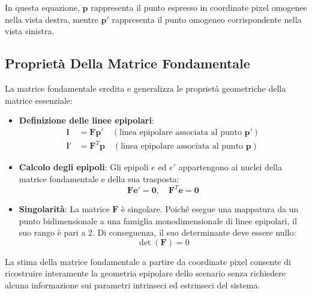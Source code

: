 ﻿\documentclass[11pt, a4paper]{article}
\begin{document}
In questa equazione, $\bm{p}$ rappresenta il punto espresso in coordinate pixel omogenee nella vista destra, mentre $\bm{p}'$ rappresenta il punto omogeneo corrispondente nella vista sinistra.

\subsection{Proprietà Della Matrice Fondamentale}

La matrice fondamentale eredita e generalizza le proprietà geometriche della matrice essenziale:


\begin{itemize}[noitemsep]
    \item \textbf{Definizione delle linee epipolari}:
    \begin{align}
        \bm{l} &= \bm{F} \bm{p}' \quad (\text{linea epipolare associata al punto } \bm{p}') \\
        \bm{l}' &= \bm{F}^T \bm{p} \quad (\text{linea epipolare associata al punto } \bm{p})
    \end{align}
    \item \textbf{Calcolo degli epipoli}: Gli epipoli $e$ ed $e'$ appartengono ai nuclei della matrice fondamentale e della sua trasposta:
    \begin{equation}
        \bm{F} \bm{e}' = \bm{0}, \quad \bm{F}^T \bm{e} = \bm{0}
    \end{equation}
    \item \textbf{Singolarità}: La matrice $\bm{F}$ è singolare. Poiché esegue una mappatura da un punto bidimensionale a una famiglia monodimensionale di linee epipolari, il suo rango è pari a 2. Di conseguenza, il suo determinante deve essere nullo:
    \begin{equation}
        \det(\bm{F}) = 0
    \end{equation}
\end{itemize}


La stima della matrice fondamentale a partire da coordinate pixel consente di ricostruire interamente la geometria epipolare dello scenario senza richiedere alcuna informazione sui parametri intrinseci ed estrinseci del sistema.
\end{document}
